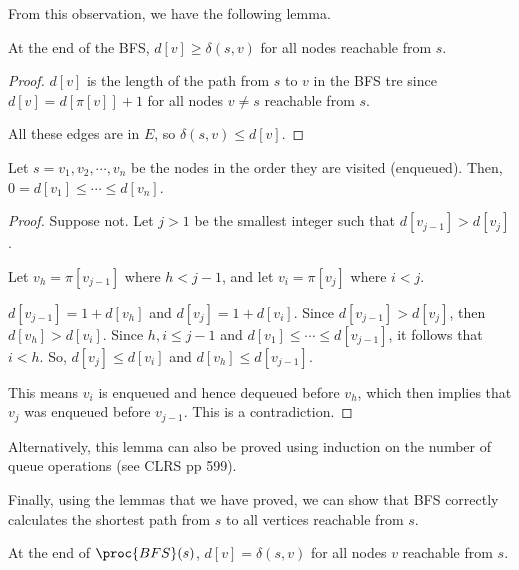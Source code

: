 From this observation, we have the following lemma.

\begin{lemma}
    At the end of the BFS, $d[v] \geq \delta(s,v)$ for all nodes reachable from $s$.
\end{lemma}

\begin{proof}
    $d[v]$ is the length of the path from $s$ to $v$ in the BFS tre since $d[v] = d[\pi[v]] + 1$ for all nodes $v \neq s$ reachable from $s$.

    All these edges are in $E$, so $\delta(s,v) \leq d[v]$.
\end{proof}

\begin{lemma}
    Let $s=v_1,v_2,\cdots,v_n$ be the nodes in the order they are visited (enqueued). Then, $0=d[v_1] \leq \cdots \leq d[v_n]$. 
\end{lemma}

\begin{proof}
    Suppose not. Let $j>1$ be the smallest integer such that $d[v_{j-1}] > d[v_j]$.
    
    Let $v_h = \pi[v_{j-1}]$ where $h < j-1$, and let $v_i = \pi[v_j]$ where $i < j$.
    
    $d[v_{j-1}] = 1 + d[v_{h}]$ and $d[v_j] = 1 + d[v_i]$. Since $d[v_{j-1}] > d[v_j]$, then $d[v_h] > d[v_i]$. Since $h,i \leq j-1$ and $d[v_1] \leq \cdots \leq d[v_{j-1}]$, it follows that $i<h$. So, $d[v_j] \leq d[v_i]$ and $d[v_h] \leq d[v_{j-1}]$.

    This means $v_i$ is enqueued and hence dequeued before $v_h$, which then implies that $v_j$ was enqueued before $v_{j-1}$. This is a contradiction.
\end{proof}

Alternatively, this lemma can also be proved using induction on the number of queue operations (see CLRS pp 599).

Finally, using the lemmas that we have proved, we can show that BFS correctly calculates the shortest path from $s$ to all vertices reachable from $s$.

\begin{theorem}
    At the end of $\proc{BFS}(s)$, $d[v] = \delta(s,v)$ for all nodes $v$ reachable from $s$.
\end{theorem}

